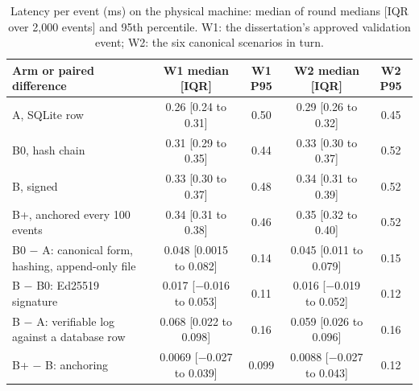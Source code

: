 \begin{table}[t]
\caption{Latency per event (ms) on the physical machine: median of round medians [IQR over 2,000 events] and 95th percentile. W1: the dissertation's approved validation event; W2: the six canonical scenarios in turn.}
\label{tab:cost}
\footnotesize
\begin{tabularx}{\textwidth}{@{}Lcccc@{}}
\toprule
Arm or paired difference & W1 median [IQR] & W1 P95 & W2 median [IQR] & W2 P95 \\
\midrule
A, SQLite row & 0.26 [0.24 to 0.31] & 0.50 & 0.29 [0.26 to 0.32] & 0.45 \\
B0, hash chain & 0.31 [0.29 to 0.35] & 0.44 & 0.33 [0.30 to 0.37] & 0.52 \\
B, signed & 0.33 [0.30 to 0.37] & 0.48 & 0.34 [0.31 to 0.39] & 0.52 \\
B+, anchored every 100 events & 0.34 [0.31 to 0.38] & 0.46 & 0.35 [0.32 to 0.40] & 0.52 \\
\midrule
B0 $-$ A: canonical form, hashing, append-only file & 0.048 [0.0015 to 0.082] & 0.14 & 0.045 [0.011 to 0.079] & 0.15 \\
B $-$ B0: Ed25519 signature & 0.017 [$-$0.016 to 0.053] & 0.11 & 0.016 [$-$0.019 to 0.052] & 0.12 \\
B $-$ A: verifiable log against a database row & 0.068 [0.022 to 0.098] & 0.16 & 0.059 [0.026 to 0.096] & 0.16 \\
B+ $-$ B: anchoring & 0.0069 [$-$0.027 to 0.039] & 0.099 & 0.0088 [$-$0.027 to 0.043] & 0.12 \\
\bottomrule
\end{tabularx}
\end{table}
